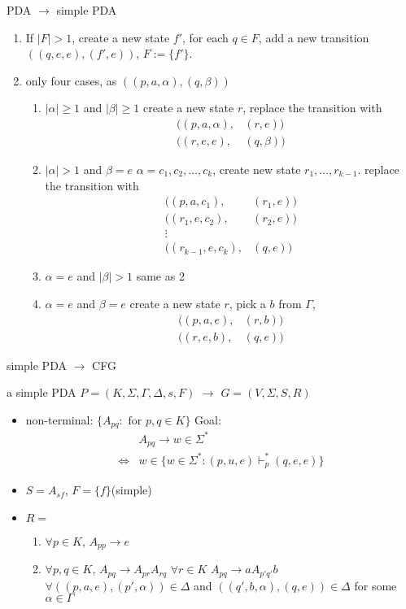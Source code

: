 PDA $\to$ simple PDA
\begin{enumerate}
    \item If $|F|>1$, create a new state $f'$, for each $q\in F$, add a new transition $((q,e,e),(f',e))$, $F:=\{ f' \}$. 
    \item only four cases, as $((p,a,\alpha),(q,\beta))$
    \begin{enumerate}
        \item $|\alpha|\ge 1$ and $|\beta|\ge 1$
        \subitem create a new state $r$, replace the transition with 
        \begin{align*}
            ((p,a,\alpha),&(r,e))\\
            ((r,e,e),&(q,\beta))
        \end{align*}
        \item $|\alpha|>1$ and $\beta=e$
        \subitem $\alpha=c_1,c_2,\dots,c_k$, create new state $r_1,\dots,r_{k-1}$. replace the transition with 
        \begin{align*}
            ((p,a,c_1),&(r_1,e))\\
            ((r_1,e,c_2),&(r_2,e))\\
            \vdots&\\
            ((r_{k-1},e,c_k),&(q,e))
        \end{align*}
        \item $\alpha=e$ and $|\beta|>1$
        \subitem same as 2
        \item $\alpha=e$ and $\beta=e$
        \subitem create a new state $r$, pick a $b$ from $\Gamma$,
        \begin{align*}
            ((p,a,e),&(r,b))\\
            ((r,e,b),&(q,e))
        \end{align*}
    \end{enumerate}
\end{enumerate}

simple PDA $\to$ CFG

a simple PDA $P=(K,\Sigma, \Gamma,\Delta,s,F)$ $\to$ $G=(V,\Sigma, S,R)$

\begin{itemize}
    \item non-terminal: $\{ A_{pq}: \text{ for }p,q\in K \}$
    \subitem Goal: 
    \begin{align*}
        &A_{pq}\to w\in\Sigma^*\\
        \iff& w\in \{ w\in\Sigma^*:(p,u,e)\vdash^*_p(q,e,e) \}
    \end{align*}
    \item $S=A_{sf}$, $F=\{ f \}$(simple)
    \item $R=$
    \begin{enumerate}
        \item $\forall p\in K$, $A_{pp}\to e$
        \item $\forall p,q\in K$,
        \subitem $A_{pq}\to A_{pr}A_{rq}$ $\forall r\in K$
        \subitem $A_{pq}\to aA_{p'q'}b$ \\
        $\forall ((p,a,e),(p',\alpha))\in\Delta$ and $((q',b,\alpha),(q,e))\in\Delta$ for some $\alpha\in\Gamma$
    \end{enumerate}
\end{itemize}

